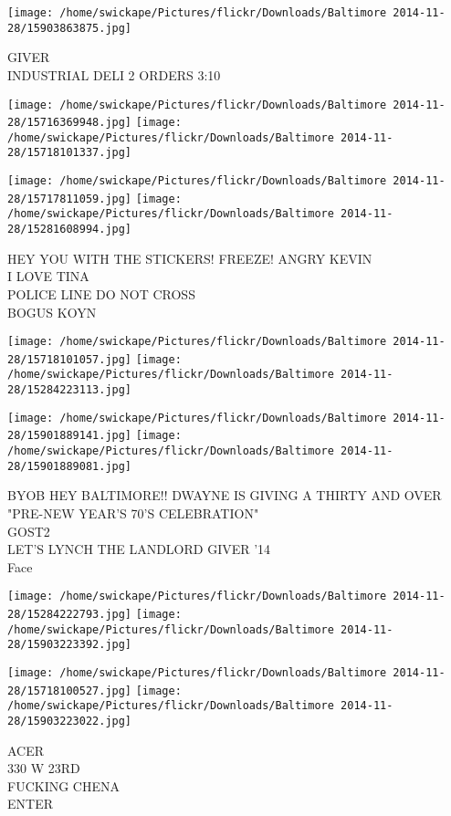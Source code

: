 \documentclass[10pt,letterpaper]{article}
\begin{document}
\vspace{0.25in}
\texttt{[image: /home/swickape/Pictures/flickr/Downloads/Baltimore 2014-11-28/15903863875.jpg]}

GIVER\\
INDUSTRIAL DELI 2 ORDERS 3:10
\pagebreak

\texttt{[image: /home/swickape/Pictures/flickr/Downloads/Baltimore 2014-11-28/15716369948.jpg]}
\texttt{[image: /home/swickape/Pictures/flickr/Downloads/Baltimore 2014-11-28/15718101337.jpg]}

\texttt{[image: /home/swickape/Pictures/flickr/Downloads/Baltimore 2014-11-28/15717811059.jpg]}
\texttt{[image: /home/swickape/Pictures/flickr/Downloads/Baltimore 2014-11-28/15281608994.jpg]}

HEY YOU WITH THE STICKERS!  FREEZE!  ANGRY KEVIN\\
I LOVE TINA\\
POLICE LINE DO NOT CROSS\\
BOGUS KOYN
\pagebreak

\texttt{[image: /home/swickape/Pictures/flickr/Downloads/Baltimore 2014-11-28/15718101057.jpg]}
\texttt{[image: /home/swickape/Pictures/flickr/Downloads/Baltimore 2014-11-28/15284223113.jpg]}

\texttt{[image: /home/swickape/Pictures/flickr/Downloads/Baltimore 2014-11-28/15901889141.jpg]}
\texttt{[image: /home/swickape/Pictures/flickr/Downloads/Baltimore 2014-11-28/15901889081.jpg]}

BYOB HEY BALTIMORE!! DWAYNE IS GIVING A THIRTY AND OVER "PRE{-}NEW YEAR'S 70'S CELEBRATION"\\
GOST2\\
LET'S LYNCH THE LANDLORD GIVER '14\\
Face
\pagebreak

\texttt{[image: /home/swickape/Pictures/flickr/Downloads/Baltimore 2014-11-28/15284222793.jpg]}
\texttt{[image: /home/swickape/Pictures/flickr/Downloads/Baltimore 2014-11-28/15903223392.jpg]}

\texttt{[image: /home/swickape/Pictures/flickr/Downloads/Baltimore 2014-11-28/15718100527.jpg]}
\texttt{[image: /home/swickape/Pictures/flickr/Downloads/Baltimore 2014-11-28/15903223022.jpg]}

ACER\\
330 W 23RD\\
FUCKING CHENA\\
ENTER
\pagebreak
\end{document}
